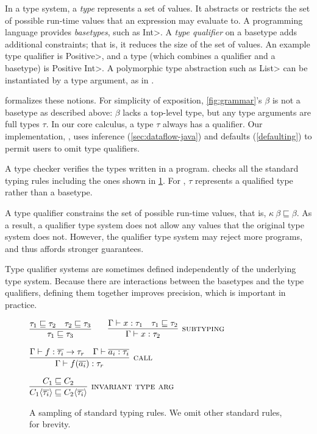 In a type system,
a \textit{type} represents a set of values.  It abstracts or restricts the
set of possible run-time values that an expression may evaluate to.
A programming language provides \emph{basetypes}, such as \<Int>.
A \textit{type qualifier} on a basetype adds additional constraints;
that is, it reduces the size of the set of values.
An example type qualifier is \<Positive>, and a type (which combines a qualifier
and a basetype) is \<Positive Int>.
A polymorphic type abstraction such as \<List> can be instantiated by a type argument,
as in .

 formalizes these notions.
For simplicity of exposition,
\cref{fig:grammar}'s $\beta$ is not a basetype as described above:  $\beta$
lacks a top-level type, but any type arguments are full types
$\tau$.
In our core calculus, a type $\tau$ always has a qualifier.
Our implementation, \theDeterminismChecker, uses inference (\cref{sec:dataflow-java}) and
defaults (\cref{defaulting}) to
permit users to omit type qualifiers.


A type checker verifies the types written in a program.
\OurTypeSystem checks all the standard typing rules including the ones
shown in \cref{typecheck-rules-standard}.  For \ourTypeSystem, $\tau$
represents a qualified type rather than a basetype.

A type qualifier constrains the set of possible run-time values, that is,
$\kappa \ \beta \sqsubseteq \beta$.
As a result, a qualifier type system does not allow any values that the
original type system does not.
However, the qualifier type system may reject more programs, and thus
affords stronger guarantees.

Type qualifier systems are sometimes defined independently of the
underlying type system.  Because there are interactions between the
basetypes and the type qualifiers, defining them together improves
precision, which is important in practice.


\begin{figure}
    \bigskip

    $\infer{\tau_1 \sqsubseteq \tau_3}{\tau_1 \sqsubseteq \tau_2 \quad \tau_2 \sqsubseteq \tau_3}
    \quad\quad
    \infer[\rulename{subtyping}]{\Gamma \vdash x : \tau_2}{\Gamma \vdash x : \tau_1 & \tau_1 \sqsubseteq \tau_2}$
    
    \bigskip
    
    $\infer[\rulename{call}]{\Gamma \vdash f(\overline{a_i}) : \tau_r}
    {\Gamma \vdash f : \overline{\tau_i} \rightarrow \tau_r & \Gamma \vdash \overline{a_i : \tau_i}}$
    
    \bigskip
    
    $\infer[\rulename{invariant type arg}]{C_1\angles{\overline{\tau_i}}
      \sqsubseteq C_2\angles{\overline{\tau_i}}}{C_1 \sqsubseteq C_2}$
    
    \caption{A sampling of standard typing rules.  We omit other standard rules,
    for brevity.}
    \label{typecheck-rules-standard}
\end{figure}

